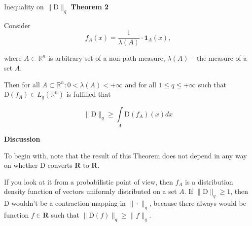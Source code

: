 \documentclass[10pt]{beamer}
\begin{document}
    \begin{frame}{Inequality on $\|\text{D}\|_q$}
        \large{\textcolor{myNewColorA}{\textbf{Theorem 2}}}
        \normalsize
        
        Consider 
        \begin{equation*}
            f_A(x) = \dfrac{1}{\lambda(A)} \cdot \textbf{1}_{A}(x),
        \end{equation*}

        where $A \subset \mathbb{R}^n$ is arbitrary set of a non-path measure, $\lambda(A)$ -- the measure of a set $A$.

        Then for all $A \subset \mathbb{R}^n :  0 < \lambda(A) < +\infty$ and for all $1 \leq q \leq +\infty$ such that $\text{D}(f_A) \in L_q(\mathbb{R}^n)$ is fulfilled that  

        \begin{equation*}
            \|\text{D}\|_q \geq \int\limits_{A} \text{D}(f_A)(x)dx
        \end{equation*}

        \large{\textcolor{myNewColorA}{\textbf{Discussion}}}
        \normalsize

        To begin with, note that the result of this Theorem does not depend in any way on whether $\text{D}$ converts $\mathbf{R}$ to $\mathbf{R}$.
    
        If you look at it from a probabilistic point of view, then $f_A$ is a distribution density function of vectors uniformly distributed on a set $A$. If $\|\text{D}\|_q \geq 1$, then $\text{D}$ wouldn't be a contraction mapping in $\|\cdot\|_q$, because there always would be function $f \in \mathbf{R}$ such that $\|\text{D}(f)\|_q \geq \|f\|_q$.
        
    \end{frame}
\end{document}
